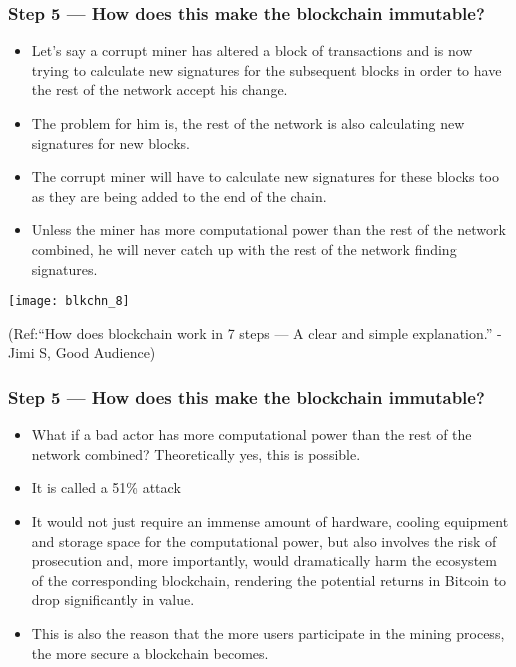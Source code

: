 \begin{frame}[fragile]\frametitle{Step 5 — How does this make the blockchain immutable?}
\begin{itemize}
\item Let’s say a corrupt miner has altered a block of transactions and is now trying to calculate new signatures for the subsequent blocks in order to have the rest of the network accept his change. 
\item The problem for him is, the rest of the network is also calculating new signatures for new blocks. 
\item The corrupt miner will have to calculate new signatures for these blocks too as they are being added to the end of the chain.
\item Unless the miner has more computational power than the rest of the network combined, he will never catch up with the rest of the network finding signatures.
\end{itemize}

\begin{center}
\texttt{[image: blkchn\_8]}

{\tiny (Ref:``How does blockchain work in 7 steps — A clear and simple explanation.'' - Jimi S, Good Audience)}
\end{center}

\end{frame}

\begin{frame}[fragile]\frametitle{Step 5 — How does this make the blockchain immutable?}
\begin{itemize}
\item What if a bad actor has more computational power than the rest of the network combined? Theoretically yes, this is possible. 
\item It is called a 51\% attack
\item It would not just require an immense amount of hardware, cooling equipment and storage space for the computational power, but also involves the risk of prosecution and, more importantly, would dramatically harm the ecosystem of the corresponding blockchain, rendering the potential returns in Bitcoin to drop significantly in value. 
\item This is also the reason that the more users participate in the mining process, the more secure a blockchain becomes.
\end{itemize}


\end{frame}

